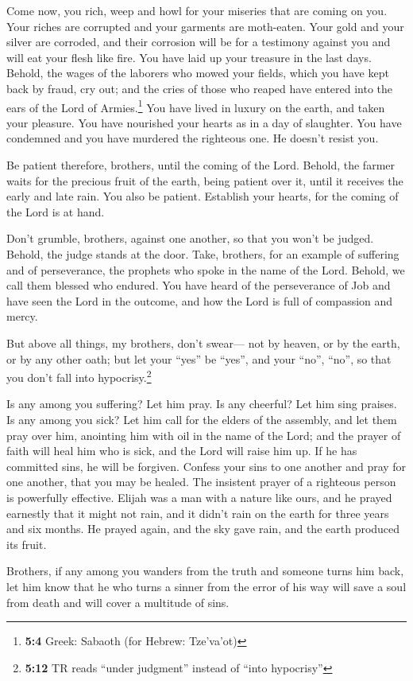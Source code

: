  Come now, you rich, weep and howl for your miseries that
are coming on you.  Your riches are corrupted and your
garments are moth-eaten.  Your gold and your silver are
corroded, and their corrosion will be for a testimony against you and
will eat your flesh like fire. You have laid up your treasure in the
last days.  Behold, the wages of the laborers who mowed
your fields, which you have kept back by fraud, cry out; and the cries
of those who reaped have entered into the ears of the Lord of
Armies.\footnote{\textbf{5:4} Greek: Sabaoth (for Hebrew: Tze'va'ot)}
 You have lived in luxury on the earth, and taken your
pleasure. You have nourished your hearts as in a day of slaughter.
 You have condemned and you have murdered the righteous
one. He doesn't resist you.

 Be patient therefore, brothers, until the coming of the
Lord. Behold, the farmer waits for the precious fruit of the earth,
being patient over it, until it receives the early and late rain.
 You also be patient. Establish your hearts, for the
coming of the Lord is at hand.

 Don't grumble, brothers, against one another, so that you
won't be judged. Behold, the judge stands at the door. 
Take, brothers, for an example of suffering and of perseverance, the
prophets who spoke in the name of the Lord.  Behold, we
call them blessed who endured. You have heard of the perseverance of Job
and have seen the Lord in the outcome, and how the Lord is full of
compassion and mercy.

 But above all things, my brothers, don't swear--- not by
heaven, or by the earth, or by any other oath; but let your ``yes'' be
``yes'', and your ``no'', ``no'', so that you don't fall into
hypocrisy.\footnote{\textbf{5:12} TR reads ``under judgment'' instead of
  ``into hypocrisy''}

 Is any among you suffering? Let him pray. Is any
cheerful? Let him sing praises.  Is any among you sick?
Let him call for the elders of the assembly, and let them pray over him,
anointing him with oil in the name of the Lord;  and the
prayer of faith will heal him who is sick, and the Lord will raise him
up. If he has committed sins, he will be forgiven. 
Confess your sins to one another and pray for one another, that you may
be healed. The insistent prayer of a righteous person is powerfully
effective.  Elijah was a man with a nature like ours, and
he prayed earnestly that it might not rain, and it didn't rain on the
earth for three years and six months.  He prayed again,
and the sky gave rain, and the earth produced its fruit.

 Brothers, if any among you wanders from the truth and
someone turns him back,  let him know that he who turns a
sinner from the error of his way will save a soul from death and will
cover a multitude of sins.
